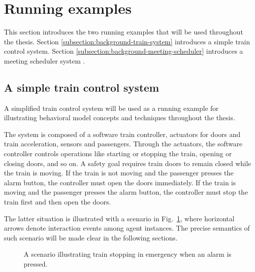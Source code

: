 \section{Running examples\label{section:background-running-examples}}

This section introduces the two running examples that will be used throughout the thesis. Section \ref{subsection:background-train-system} introduces a simple train control system. Section \ref{subsection:background-meeting-scheduler} introduces a meeting scheduler system \cite{Feather:1997}.

\subsection{A simple train control system\label{subsection:background-train-system}}

A simplified train control system will be used as a running example for illustrating behavioral model concepts and techniques throughout the thesis. 

The system is composed of a software train controller, actuators for doors and train acceleration, sensors and passengers. Through the actuators, the software controller controls operations like starting or stopping the train, opening or closing doors, and so on. A safety goal requires train doors to remain closed while the train is moving. If the train is not moving and the passenger presses the alarm button, the controller must open the doors immediately. If the train is moving and the passenger presses the alarm button, the controller must stop the train first and then open the doors. 

The latter situation is illustrated with a scenario in Fig.~\ref{image:train-scenario-all-agents}, where horizontal arrows denote interaction events among agent instances. The precise semantics of such scenario will be made clear in the following sections.

\begin{figure}[H]\centering
{}
\caption{A scenario illustrating train stopping in emergency when an alarm is pressed.\label{image:train-scenario-all-agents}}
\end{figure}

